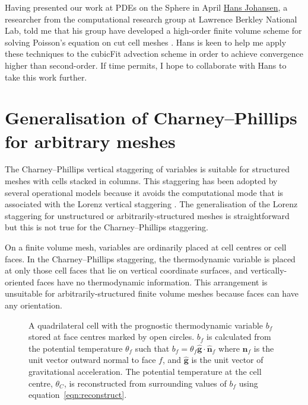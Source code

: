 \documentclass[a4paper,11pt]{article}
\begin{document}
Having presented our work at PDEs on the Sphere in April \href{http://crd.lbl.gov/departments/applied-mathematics/ANAG/about/staff-and-postdocs/hans-johansen/}{Hans Johansen}, a researcher from the computational research group at Lawrence Berkley National Lab, told me that his group have developed a high-order finite volume scheme for solving Poisson's equation on cut cell meshes \citep{devendran2015}.  Hans is keen to help me apply these techniques to the cubicFit advection scheme in order to achieve convergence higher than second-order.  If time permits, I hope to collaborate with Hans to take this work further.

\section{Generalisation of Charney--Phillips for arbitrary meshes}

The Charney--Phillips vertical staggering of variables \citep{charney-phillips1953} is suitable for structured meshes with cells stacked in columns. This staggering has been adopted by several operational models \citep{davies2005,yang2007,girard2014} because it avoids the computational mode that is associated with the Lorenz vertical staggering \citep{arakawa-konor1996}. The generalisation of the Lorenz staggering for unstructured or arbitrarily-structured meshes is straightforward \citep{weller-shahrokhi2014} but this is not true for the Charney--Phillips staggering.

On a finite volume mesh, variables are ordinarily placed at cell centres or cell faces. In the Charney--Phillips staggering, the thermodynamic variable is placed at only those cell faces that lie on vertical coordinate surfaces, and vertically-oriented faces have no thermodynamic information. This arrangement is unsuitable for arbitrarily-structured finite volume meshes because faces can have any orientation.

\begin{figure}
\centering

	\caption{A quadrilateral cell with the prognostic thermodynamic variable $b_f$ stored at face centres marked by open circles.  $b_f$ is calculated from the potential temperature $\theta_f$ such that $b_f = \theta_f \mathbf{\hat{g}} \cdot \mathbf{\hat{n}}_f$ where $\mathbf{\hat{n}}_f$ is the unit vector outward normal to face $f$, and $\mathbf{\hat{g}}$ is the unit vector of gravitational acceleration.  The potential temperature at the cell centre, $\theta_C$, is reconstructed from surrounding values of $b_f$ using equation~\eqref{eqn:reconstruct}.}
\label{fig:cp-staggering}
\end{figure}
\end{document}
